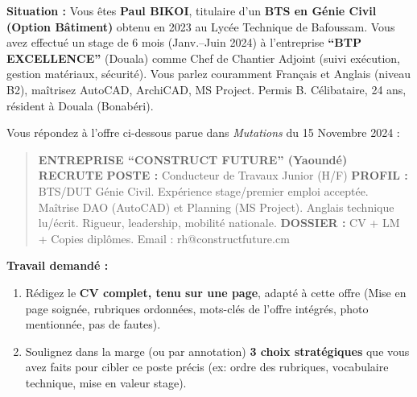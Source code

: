 \documentclass[11pt]{article}
\newcounter{popsec}
\newcounter{popsub}
\newcommand{\courssub}[1]{%
  \stepcounter{popsub}%
  \par\vspace{9pt}\noindent{\popxbold\fontsize{11.5}{13}\selectfont\color{popink}{\color{poporange}\thepopsec.\thepopsub}\hspace{6pt}#1}\par\nopagebreak\vspace{4pt}
}
\begin{document}
\courssub{Je me prépare au Bac}

\begin{exercice}
\textbf{Situation :} Vous êtes \textbf{Paul BIKOI}, titulaire d'un \textbf{BTS en Génie Civil (Option Bâtiment)} obtenu en 2023 au Lycée Technique de Bafoussam. Vous avez effectué un stage de 6 mois (Janv.--Juin 2024) à l'entreprise \textbf{``BTP EXCELLENCE''} (Douala) comme Chef de Chantier Adjoint (suivi exécution, gestion matériaux, sécurité). Vous parlez couramment Français et Anglais (niveau B2), maîtrisez AutoCAD, ArchiCAD, MS Project. Permis B. Célibataire, 24 ans, résident à Douala (Bonabéri).

Vous répondez à l'offre ci-dessous parue dans \emph{Mutations} du 15 Novembre 2024 :

\begin{quote}
\textbf{ENTREPRISE ``CONSTRUCT FUTURE'' (Yaoundé) RECRUTE}
\textbf{POSTE :} Conducteur de Travaux Junior (H/F)
\textbf{PROFIL :} BTS/DUT Génie Civil. Expérience stage/premier emploi acceptée. Maîtrise DAO (AutoCAD) et Planning (MS Project). Anglais technique lu/écrit. Rigueur, leadership, mobilité nationale.
\textbf{DOSSIER :} CV + LM + Copies diplômes. Email : rh@constructfuture.cm
\end{quote}

\textbf{Travail demandé :}
\begin{enumerate}
    \item Rédigez le \textbf{CV complet, tenu sur une page}, adapté à cette offre (Mise en page soignée, rubriques ordonnées, mots-clés de l'offre intégrés, photo mentionnée, pas de fautes).
    \item Soulignez dans la marge (ou par annotation) \textbf{3 choix stratégiques} que vous avez faits pour cibler ce poste précis (ex: ordre des rubriques, vocabulaire technique, mise en valeur stage).
\end{enumerate}
\end{exercice}
\end{document}

